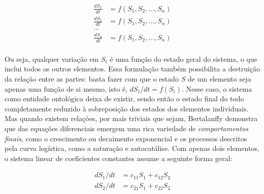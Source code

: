 \documentclass[./main.tex]{subfiles}
\begin{document}
\begin{linenomath*}
\begin{equation}
\label{eq:systems}
\begin{split}
    \frac{dS_1}{dt} &= f(S_1, S_2, ..., S_n)\\
    \frac{dS_2}{dt} &= f(S_1, S_2, ..., S_n)\\
    ...\\
    \frac{dS_n}{dt} &= f(S_1, S_2, ..., S_n)\\
\end{split}
\end{equation}
\end{linenomath*}
Ou seja, qualquer variação em $S_i$ é uma função do estado geral do sistema, o que inclui todos os outros elementos. Essa formulação também possibilita a destruição da relação entre as partes: basta fazer com que o estado $S$ de um elemento seja apenas uma função de si mesmo, isto é,  $dS_i/dt = f(S_i)$. Nesse caso, o sistema como entidade ontológica deixa de existir, sendo então o estado final do todo completamente reduzido à sobreposição dos estados dos elementos individuais. Mas quando existem relações, por mais triviais que sejam, Bertalanffy demonstra que das equações diferenciais emergem uma rica variedade de \textit{comportamentos finais}, como o crescimento ou decaimento exponencial e os processos descritos pela curva logística, como a saturação e autocatálise. Com apenas dois elementos, o sistema linear de coeficientes constantes assume a seguinte forma geral:
\begin{linenomath*}
\[
\begin{split}
    dS_1/dt &= c_{11}S_1 + c_{12}S_2\\
    dS_2/dt &= c_{21}S_1 + c_{22}S_2\\
\end{split}
\]
\end{linenomath*}
\end{document}
